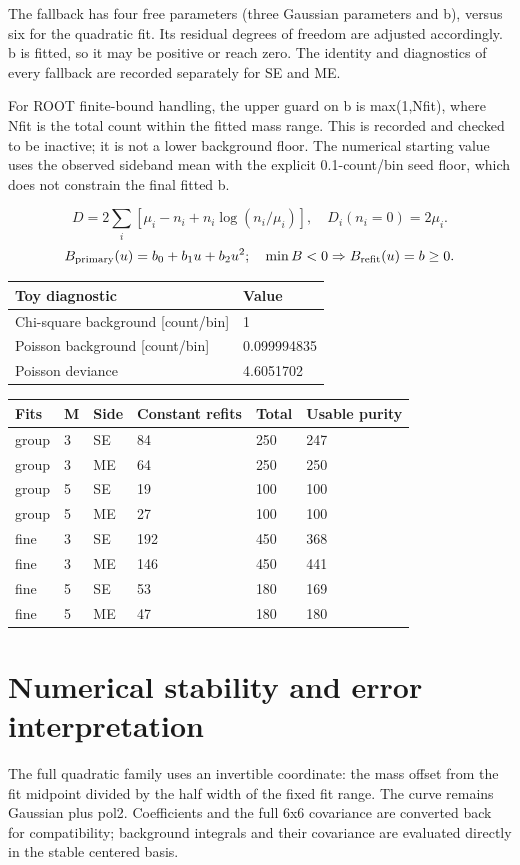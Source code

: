 \documentclass[10pt,a4paper]{article}
\begin{document}
The fallback has four free parameters (three Gaussian parameters and b), versus six for the quadratic fit. Its residual degrees of freedom are adjusted accordingly. b is fitted, so it may be positive or reach zero. The identity and diagnostics of every fallback are recorded separately for SE and ME.

For ROOT finite-bound handling, the upper guard on b is max(1,Nfit), where Nfit is the total count within the fitted mass range. This is recorded and checked to be inactive; it is not a lower background floor. The numerical starting value uses the observed sideband mean with the explicit 0.1-count/bin seed floor, which does not constrain the final fitted b.

\[D=2\sum_i[\mu_i-n_i+n_i\log(n_i/\mu_i)],\quad D_i(n_i=0)=2\mu_i.\]
\[B_{\rm primary}(u)=b_0+b_1u+b_2u^2;\quad \min B<0\Rightarrow B_{\rm refit}(u)=b\geq0.\]
{\small\setlength{\tabcolsep}{3pt}\begin{longtable}{ll}\toprule
Toy diagnostic & Value\\\midrule\endhead
Chi-square background [count/bin] & 1\\
Poisson background [count/bin] & 0.099994835\\
Poisson deviance & 4.6051702\\
\bottomrule\end{longtable}}
{\small\setlength{\tabcolsep}{3pt}\begin{longtable}{llllll}\toprule
Fits & M & Side & Constant refits & Total & Usable purity\\\midrule\endhead
group & 3 & SE & 84 & 250 & 247\\
group & 3 & ME & 64 & 250 & 250\\
group & 5 & SE & 19 & 100 & 100\\
group & 5 & ME & 27 & 100 & 100\\
fine & 3 & SE & 192 & 450 & 368\\
fine & 3 & ME & 146 & 450 & 441\\
fine & 5 & SE & 53 & 180 & 169\\
fine & 5 & ME & 47 & 180 & 180\\
\bottomrule\end{longtable}}
\clearpage
\section*{Numerical stability and error interpretation}
The full quadratic family uses an invertible coordinate: the mass offset from the fit midpoint divided by the half width of the fixed fit range. The curve remains Gaussian plus pol2. Coefficients and the full 6x6 covariance are converted back for compatibility; background integrals and their covariance are evaluated directly in the stable centered basis.
\end{document}
